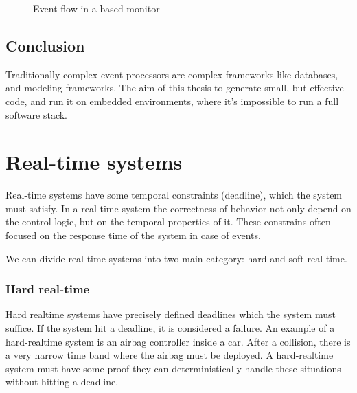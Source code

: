 \begin{figure}
	\centering
	\caption{Event flow in a \cep based monitor}
	\label{fig:cep_monitoring_event_flow}
\end{figure}

\subsection{Conclusion}

Traditionally complex event processors are complex frameworks like databases, and modeling frameworks. The aim of this thesis to generate small, but effective code, and run it on embedded environments, where it's impossible to run a full \cep software stack.

\section{Real-time systems}

Real-time systems have some temporal constraints (deadline), which the system must satisfy. In a real-time system the correctness of behavior not only depend on the control logic, but on the temporal properties of it. These constrains often focused on the response time of the system in case of events.

We can divide real-time systems into two main category: hard and soft real-time.

\subsubsection{Hard real-time}

Hard realtime systems have precisely defined deadlines which the system must suffice. If the system hit a deadline, it is considered a failure. An example of a hard-realtime system is an airbag controller inside a car. After a collision, there is a very narrow time band where the airbag must be deployed. A hard-realtime system must have some proof they can deterministically handle these situations without hitting a deadline.

